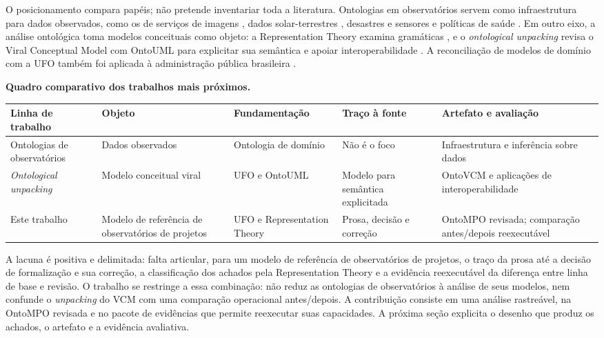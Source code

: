 O posicionamento compara papéis; não pretende inventariar toda a literatura. Ontologias em observatórios servem como infraestrutura para dados observados, como os de serviços de imagens \cite{chen2008apply}, dados solar-terrestres \cite{fox2009ontology}, desastres e sensores \cite{masmoudi2018ontology} e políticas de saúde \cite{yoshiura2018towards}. Em outro eixo, a análise ontológica toma modelos conceituais como objeto: a Representation Theory examina gramáticas \cite{recker2011ontological}, e o \textit{ontological unpacking} revisa o Viral Conceptual Model com OntoUML para explicitar sua semântica e apoiar interoperabilidade \cite{bernasconi2022semantic}. A reconciliação de modelos de domínio com a UFO também foi aplicada à administração pública brasileira \cite{detoni2019ontologia}.

\textbf{Quadro comparativo dos trabalhos mais próximos.}

\begin{table}[H]
\centering
\scriptsize
\setlength{\tabcolsep}{3pt}
\begin{tabularx}{\linewidth}{>{\raggedright\arraybackslash\hsize=0.9420\hsize}X>{\raggedright\arraybackslash\hsize=0.9420\hsize}X>{\raggedright\arraybackslash\hsize=1.0145\hsize}X>{\raggedright\arraybackslash\hsize=0.7971\hsize}X>{\raggedright\arraybackslash\hsize=1.3043\hsize}X}
\hline
\textbf{Linha de trabalho} & \textbf{Objeto} & \textbf{Fundamentação} & \textbf{Traço à fonte} & \textbf{Artefato e avaliação} \\
\hline
Ontologias de observatórios & Dados observados & Ontologia de domínio & Não é o foco & Infraestrutura e inferência sobre dados \\
\textit{Ontological unpacking} & Modelo conceitual viral & UFO e OntoUML & Modelo para semântica explicitada & OntoVCM e aplicações de interoperabilidade \\
Este trabalho & Modelo de referência de observatórios de projetos & UFO e Representation Theory & Prosa, decisão e correção & OntoMPO revisada; comparação antes/depois reexecutável \\
\hline
\end{tabularx}
\end{table}

A lacuna é positiva e delimitada: falta articular, para um modelo de referência de observatórios de projetos, o traço da prosa até a decisão de formalização e sua correção, a classificação dos achados pela Representation Theory e a evidência reexecutável da diferença entre linha de base e revisão. O trabalho se restringe a essa combinação: não reduz as ontologias de observatórios à análise de seus modelos, nem confunde o \textit{unpacking} do VCM com uma comparação operacional antes/depois. A contribuição consiste em uma análise rastreável, na OntoMPO revisada e no pacote de evidências que permite reexecutar suas capacidades. A próxima seção explicita o desenho que produz os achados, o artefato e a evidência avaliativa.
